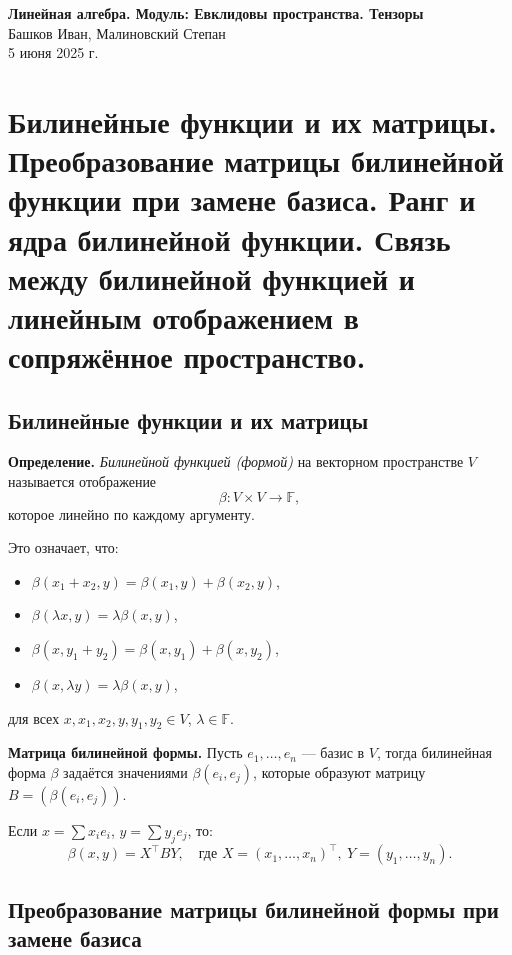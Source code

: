 \documentclass[12pt]{article}
\begin{document}
\begin{center}
    {\LARGE \textbf{Линейная алгебра. Модуль: Евклидовы пространства. Тензоры}}\\
    \vspace{0.3em}
    Башков Иван, Малиновский Степан\\
    \vspace{0.3em}
    5 июня 2025 г.
\end{center}

\section{Билинейные функции и их матрицы. Преобразование матрицы билинейной функции при замене базиса. Ранг и ядра билинейной функции. Связь между билинейной функцией и линейным отображением в сопряжённое пространство.}

\subsection{Билинейные функции и их матрицы}

\textbf{Определение.} \textit{Билинейной функцией (формой)} на векторном пространстве $V$ называется отображение 
\[
\beta: V \times V \to \mathbb{F},
\]
которое линейно по каждому аргументу.

Это означает, что:
\begin{itemize}
    \item $\beta(x_1 + x_2, y) = \beta(x_1, y) + \beta(x_2, y)$,
    \item $\beta(\lambda x, y) = \lambda \beta(x, y)$,
    \item $\beta(x, y_1 + y_2) = \beta(x, y_1) + \beta(x, y_2)$,
    \item $\beta(x, \lambda y) = \lambda \beta(x, y)$,
\end{itemize}
для всех $x, x_1, x_2, y, y_1, y_2 \in V$, $\lambda \in \mathbb{F}$.

\vspace{0.5em}
\textbf{Матрица билинейной формы.} Пусть $e_1, \dots, e_n$ — базис в $V$, тогда билинейная форма $\beta$ задаётся значениями $\beta(e_i, e_j)$, которые образуют матрицу $B = (\beta(e_i, e_j))$.

Если $x = \sum x_i e_i$, $y = \sum y_j e_j$, то:
\[
\beta(x, y) = X^\top B Y, \quad \text{где } X = (x_1, \dots, x_n)^\top,\ Y = (y_1, \dots, y_n).
\]

\subsection{Преобразование матрицы билинейной формы при замене базиса}
\end{document}
